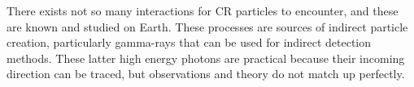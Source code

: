 There exists not so many interactions for CR particles to encounter, and these are known and studied on Earth. These processes are sources of indirect particle creation, particularly gamma-rays that can be used for indirect detection methods. These latter high energy photons are practical because their incoming direction can be traced, but observations and theory do not match up perfectly. 


	
	
%
%
%
%
%
